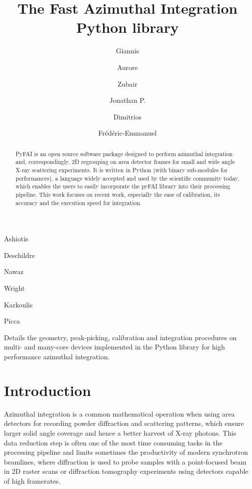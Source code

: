 \documentclass{iucr}
\begin{document}
\title{The Fast Azimuthal Integration Python library}

    \author[a]{Giannis}{Ashiotis}
    \author[a]{Aurore}{Deschildre}
    \author[b]{Zubair}{Nawaz}
    \author[a]{Jonathan P.}{Wright}
    \author[a]{Dimitrios}{Karkoulis}
    \author[c]{Fr\'ed\'eric-Emmanuel}{Picca}


\maketitle

\begin{synopsis}
Details the geometry, peak-picking, calibration and integration procedures
on multi- and many-core devices implemented in the Python library for high
performance azimuthal integration.
\end{synopsis}

\begin{abstract}
PyFAI is an open source software package designed to perform azimuthal
integration and, correspondingly, 2D regrouping on area detector frames for small 
and wide angle X-ray scattering experiments.
It is written in Python (with binary sub-modules for performances), a
language widely accepted and used by the scientific community today, which enables
the users to easily incorporate the pyFAI library into their processing pipeline.
This work focuses on recent work, especially the ease of
calibration, its accuracy and the execution speed for integration.
\end{abstract}

\section{Introduction}

Azimuthal integration is a common mathematical operation when using area
detectors for recording powder diffraction and scattering patterns, which
ensure larger solid angle coverage and hence a better harvest of X­-ray photons.
This data reduction step is often one of the most time ­consuming tasks in the
processing pipeline and limits sometimes the productivity of modern synchrotron
beamlines, where diffraction is used to probe samples with a point-focused
beam in 2D raster scans or diffraction tomography experiments using
detectors capable of high framerates.
\end{document}
